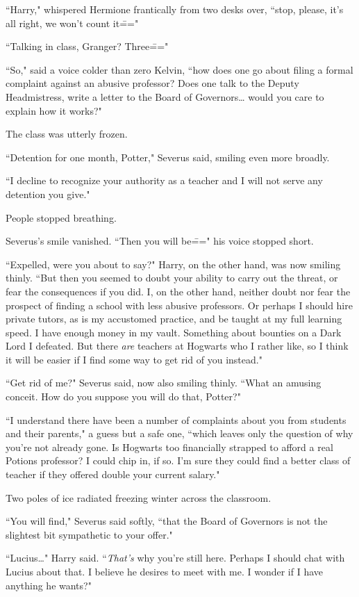 ``Harry," whispered Hermione frantically from two desks over, ``stop, please, it's all right, we won't count it\==="

``Talking in class, Granger? Three\==="

``So," said a voice colder than zero Kelvin, ``how does one go about filing a formal complaint against an abusive professor? Does one talk to the Deputy Headmistress, write a letter to the Board of Governors{\ldots} would you care to explain how it works?"

The class was utterly frozen.

``Detention for one month, Potter," Severus said, smiling even more broadly.

``I decline to recognize your authority as a teacher and I will not serve any detention you give."

People stopped breathing.

Severus's smile vanished. ``Then you will be\===" his voice stopped short.

``Expelled, were you about to say?" Harry, on the other hand, was now smiling thinly. ``But then you seemed to doubt your ability to carry out the threat, or fear the consequences if you did. I, on the other hand, neither doubt nor fear the prospect of finding a school with less abusive professors. Or perhaps I should hire private tutors, as is my accustomed practice, and be taught at my full learning speed. I have enough money in my vault. Something about bounties on a Dark Lord I defeated. But there \emph{are} teachers at Hogwarts who I rather like, so I think it will be easier if I find some way to get rid of you instead."

``Get rid of me?" Severus said, now also smiling thinly. ``What an amusing conceit. How do you suppose you will do that, Potter?"

``I understand there have been a number of complaints about you from students and their parents," a guess but a safe one, ``which leaves only the question of why you're not already gone. Is Hogwarts too financially strapped to afford a real Potions professor? I could chip in, if so. I'm sure they could find a better class of teacher if they offered double your current salary."

Two poles of ice radiated freezing winter across the classroom.

``You will find," Severus said softly, ``that the Board of Governors is not the slightest bit sympathetic to your offer."

``Lucius{\ldots}" Harry said. ``\emph{That's} why you're still here. Perhaps I should chat with Lucius about that. I believe he desires to meet with me. I wonder if I have anything he wants?"

